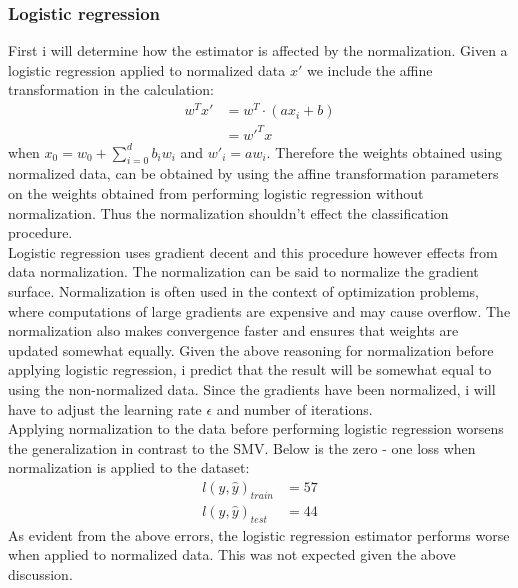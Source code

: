 \documentclass{article}
\begin{document}
\subsubsection{Logistic regression}
First i will determine how the estimator is affected by the normalization. Given a logistic regression applied to normalized data $ x'$ we include the affine transformation in the calculation:
\begin{align*}
w^Tx' &= w^T \cdot (a x_i +b) \\
&= w'^Tx
\end{align*}
when $x_0 = w_0 + \sum_{i=0}^d b_i w_i$ and $ w'_i = a w_i$. Therefore the weights obtained using normalized data, can be obtained by using the affine transformation parameters on the weights obtained from performing logistic regression without normalization. Thus the normalization shouldn't effect the classification procedure. \\
Logistic regression uses gradient decent and this procedure however effects from data normalization. The normalization can be said to normalize the gradient surface. Normalization is often  used in the context of optimization problems, where computations of large gradients are expensive and may cause overflow. The normalization also makes convergence faster and ensures that weights are updated somewhat equally. Given the above reasoning for normalization before applying logistic regression, i predict that the result will be somewhat equal to using the non-normalized data. Since the gradients have been normalized, i will have to adjust the learning rate $\epsilon$ and number of iterations. \\
Applying normalization to the data before performing logistic regression worsens the generalization in contrast to the SMV. Below is the zero - one loss when normalization is applied to the dataset:
\begin{align*}
l(y,\hat{y})_{train} &= 57\\
l(y,\hat{y})_{test} &= 44
\end{align*}
As evident from the above errors, the logistic regression estimator performs worse when applied to normalized data. This was not expected given the above discussion.
\end{document}
